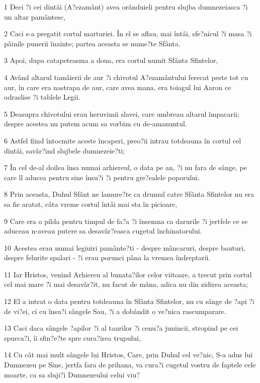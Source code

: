 \par 1 Deci ?i cei dintâi (A?ezamânt) avea orânduieli pentru slujba dumnezeiasca ?i un altar pamântesc,
\par 2 Caci s-a pregatit cortul marturiei. În el se aflau, mai întâi, sfe?nicul ?i masa ?i pâinile punerii înainte; partea aceasta se nume?te Sfânta.
\par 3 Apoi, dupa catapeteasma a doua, era cortul numit Sfânta Sfintelor,
\par 4 Având altarul tamâierii de aur ?i chivotul A?ezamântului ferecat peste tot cu aur, în care era nastrapa de aur, care avea mana, era toiagul lui Aaron ce odraslise ?i tablele Legii.
\par 5 Deasupra chivotului erau heruvimii slavei, care umbreau altarul împacarii; despre acestea nu putem acum sa vorbim cu de-amanuntul.
\par 6 Astfel fiind întocmite aceste încaperi, preo?ii intrau totdeauna în cortul cel dintâi, savâr?ind slujbele dumnezeie?ti;
\par 7 În cel de-al doilea însa numai arhiereul, o data pe an, ?i nu fara de sânge, pe care îl aducea pentru sine însu?i ?i pentru gre?ealele poporului.
\par 8 Prin aceasta, Duhul Sfânt ne lamure?te ca drumul catre Sfânta Sfintelor nu era sa fie aratat, câta vreme cortul întâi mai sta în picioare,
\par 9 Care era o pilda pentru timpul de fa?a ?i însemna ca darurile ?i jertfele ce se aduceau n-aveau putere sa desavâr?easca cugetul închinatorului.
\par 10 Acestea erau numai legiuiri pamânte?ti - despre mâncaruri, despre bauturi, despre felurite spalari - ?i erau porunci pâna la vremea îndreptarii.
\par 11 Iar Hristos, venind Arhiereu al bunata?ilor celor viitoare, a trecut prin cortul cel mai mare ?i mai desavâr?it, nu facut de mâna, adica nu din zidirea aceasta;
\par 12 El a intrat o data pentru totdeauna în Sfânta Sfintelor, nu cu sânge de ?api ?i de vi?ei, ci cu însu?i sângele Sau, ?i a dobândit o ve?nica rascumparare.
\par 13 Caci daca sângele ?apilor ?i al taurilor ?i cenu?a junincii, stropind pe cei spurca?i, îi sfin?e?te spre cura?irea trupului,
\par 14 Cu cât mai mult sângele lui Hristos, Care, prin Duhul cel ve?nic, S-a adus lui Dumnezeu pe Sine, jertfa fara de prihana, va cura?i cugetul vostru de faptele cele moarte, ca sa sluji?i Dumnezeului celui viu?
